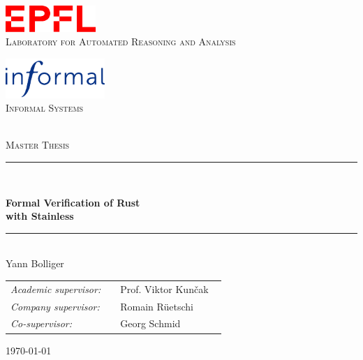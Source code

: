 \thispagestyle{empty}
\begin{center}

\vspace{4cm}
\begin{minipage}[b]{.4\textwidth}
  \begin{center}
    \includegraphics[height=10mm]{img/epfl-logo.pdf}\\
    \vspace*{3mm}
    \textsc{Laboratory for Automated Reasoning and Analysis}
  \end{center}
\end{minipage}
\begin{minipage}[b]{.4\textwidth}
  \begin{center}
    \includegraphics[height=15mm]{img/informal-logo.pdf}\\
    \textsc{Informal Systems}\\~
  \end{center}
\end{minipage}

\vspace{4cm}
{\Large \textsc{Master Thesis}}
\vspace*{1cm}

\rule{.9\linewidth}{.6pt}\\[0.4cm]
{\huge \bfseries Formal Verification of Rust \\ with Stainless \par}\vspace{0.4cm}
\rule{.9\linewidth}{.6pt}\\[1.5cm]

\vspace*{1cm}
{\Large Yann Bolliger}
\vspace*{1cm}

\begin{tabular}{ll}
\textit{Academic supervisor:}   & ~~Prof. Viktor Kun\v{c}ak \\
\textit{Company supervisor:} & ~~Romain Rüetschi ~~~~ \\
\textit{Co-supervisor:}       & ~~Georg Schmid
\end{tabular}

\vspace*{3cm}
\today\\[4cm] %

\end{center}
\clearpage


